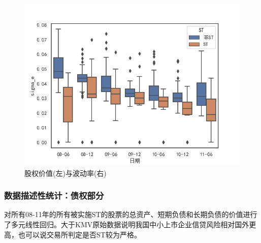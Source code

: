 \documentclass{ctexbeamer}
\begin{document}
\begin{frame}
\begin{figure}
\begin{minipage}{0.48\linewidth}
            \includegraphics[width=\textwidth]{img/sigma_e.png}
        \end{minipage}
        \caption{股权价值(左)与波动率(右)}
    \end{figure}
\end{frame}
\begin{frame}
    \frametitle{数据描述性统计：债权部分}
    对所有08-11年的所有被实施ST的股票的总资产、短期负债和长期负债的价值进行了多元线性回归。大于KMV原始数据说明我国中小上市企业信贷风险相对国外更高，也可以说交易所判定是否ST较为严格。
\end{frame}
\end{document}
